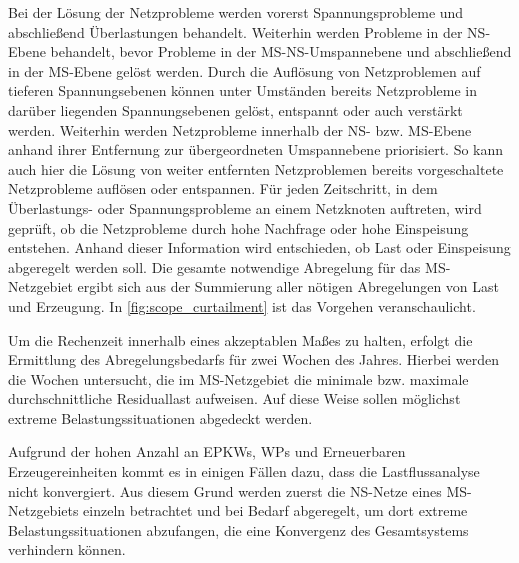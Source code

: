 Bei der Lösung der Netzprobleme werden vorerst Spannungsprobleme und abschließend Überlastungen behandelt.
Weiterhin werden Probleme in der \gls{NS}-Ebene behandelt, bevor Probleme in der \gls{MS}-\gls{NS}-Umspannebene und abschließend in der \gls{MS}-Ebene gelöst werden.
Durch die Auflösung von Netzproblemen auf tieferen Spannungsebenen können unter Umständen bereits Netzprobleme in darüber liegenden Spannungsebenen gelöst, entspannt oder auch verstärkt werden.
Weiterhin werden Netzprobleme innerhalb der \gls{NS}- bzw. \gls{MS}-Ebene anhand ihrer Entfernung zur übergeordneten Umspannebene priorisiert.
So kann auch hier die Lösung von weiter entfernten Netzproblemen bereits vorgeschaltete Netzprobleme auflösen oder entspannen.
Für jeden Zeitschritt, in dem Überlastungs- oder Spannungsprobleme an einem Netzknoten auftreten, wird geprüft, ob die Netzprobleme durch hohe Nachfrage oder hohe Einspeisung entstehen.
Anhand dieser Information wird entschieden, ob Last oder Einspeisung abgeregelt werden soll.
Die gesamte notwendige Abregelung für das \gls{MS}-Netzgebiet ergibt sich aus der Summierung aller nötigen Abregelungen von Last und Erzeugung.
In \autoref{fig:scope_curtailment} ist das Vorgehen veranschaulicht. \cite{Schachler}



Um die Rechenzeit innerhalb eines akzeptablen Maßes zu halten, erfolgt die Ermittlung des Abregelungsbedarfs für zwei Wochen des Jahres.
Hierbei werden die Wochen untersucht, die im \gls{MS}-Netzgebiet die minimale bzw. maximale durchschnittliche Residuallast aufweisen.
Auf diese Weise sollen möglichst extreme Belastungssituationen abgedeckt werden.\medskip

Aufgrund der hohen Anzahl an \glspl{EPKW}, \glspl{WP} und Erneuerbaren Erzeugereinheiten kommt es in einigen Fällen dazu, dass die Lastflussanalyse nicht konvergiert.
Aus diesem Grund werden zuerst die \gls{NS}-Netze eines \gls{MS}-Netzgebiets einzeln betrachtet und bei Bedarf abgeregelt, um dort extreme Belastungssituationen abzufangen, die eine Konvergenz des Gesamtsystems verhindern können.

\clearpage
